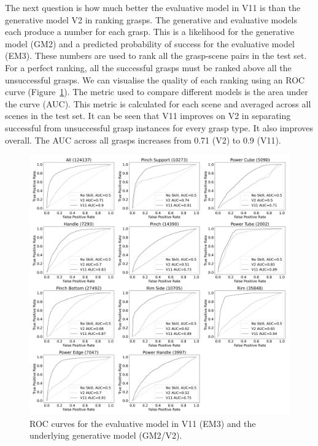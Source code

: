The next question is how much better the evaluative model in V11 is than the generative model V2 in ranking grasps. The generative and evaluative models each produce a number for each grasp. This is a likelihood for the generative model (GM2) and a predicted probability of success for the evaluative model (EM3). These numbers are used to rank all the grasp-scene pairs in the test set. For a perfect ranking, all the successful grasps must be ranked above all the unsuccessful grasps. We can visualise the quality of each ranking using an ROC curve (Figure~\ref{fig:roc}). The metric used to compare different models is the area under the curve (AUC). This metric is calculated for each scene and averaged across all scenes in the test set. It can be seen that V11 improves on V2 in separating successful from unsuccessful grasp instances for every grasp type. It also improves overall. The AUC across all grasps increases from 0.71 (V2) to 0.9 (V11). 

\begin{figure}[h]
\centering
\includegraphics[width=0.9\columnwidth]{images/post-analysis/V11_vs_v2_ROC_across_all_scenes}
\caption{\label{fig:roc}ROC curves for the evaluative model in V11 (EM3) and the underlying generative model (GM2/V2).}
\end{figure}


